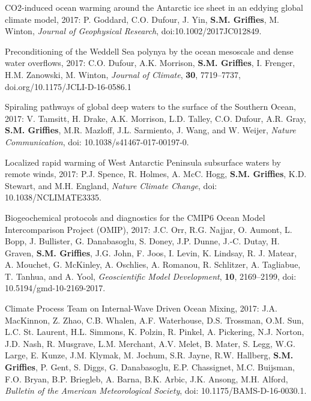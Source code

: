 \begin{etaremune}
\item CO2-induced ocean warming around the Antarctic ice sheet in an eddying global climate model, 2017: P. Goddard, C.O. Dufour, J. Yin, {\bf S.M. Grif\/f\/ies}, M. Winton, {\it Journal of Geophysical Research}, doi:10.1002/2017JC012849. 

\item Preconditioning of the Weddell Sea polynya by the ocean mesoscale and dense water overflows, 2017: C.O. Dufour, A.K. Morrison, {\bf S.M. Grif\/f\/ies}, I. Frenger, H.M. Zanowski, M. Winton, {\it Journal of Climate}, {\bf 30}, 7719--7737, doi.org/10.1175/JCLI-D-16-0586.1

\item Spiraling pathways of global deep waters to the surface of the Southern Ocean, 2017: V. Tamsitt, H.  Drake, A.K. Morrison, L.D. Talley, C.O. Dufour, A.R. Gray, {\bf S.M. Grif\/f\/ies}, M.R. Mazloff, J.L. Sarmiento, J. Wang, and W. Weijer, {\it Nature Communication}, doi: 10.1038/s41467-017-00197-0.

\item Localized rapid warming of West Antarctic Peninsula subsurface waters by remote winds, 2017: P.J. Spence, R. Holmes, A. McC. Hogg,   {\bf S.M. Grif\/f\/ies}, K.D. Stewart, and M.H. England, {\it Nature Climate Change}, doi: 10.1038/NCLIMATE3335.

\item Biogeochemical protocols and diagnostics for the CMIP6 Ocean Model Intercomparison Project (OMIP), 2017: J.C. Orr, R.G. Najjar, O. Aumont, L.  Bopp, J. Bullister, G. Danabasoglu, S. Doney,  J.P. Dunne, J.-C. Dutay, H. Graven, {\bf S.M. Grif\/f\/ies}, J.G. John, F. Joos, I. Levin, K. Lindsay, R. J. Matear, A. Mouchet, G. McKinley, A. Oschlies, A. Romanou, R. Schlitzer, A. Tagliabue, T. Tanhua, and A. Yool, {\it Geoscientific Model Development}, {\bf 10}, 2169--2199, doi: 10.5194/gmd-10-2169-2017.

\item Climate Process Team on Internal-Wave Driven Ocean Mixing, 2017:  J.A. MacKinnon,
Z. Zhao, C.B. Whalen, A.F. Waterhouse, D.S. Trossman, O.M. Sun, L.C. St. Laurent, H.L. Simmons, K. Polzin, R. Pinkel, A. Pickering, 
N.J. Norton, J.D. Nash, R. Musgrave, L.M. Merchant, A.V. Melet, B. Mater, S. Legg, 
W.G. Large, E. Kunze, J.M. Klymak,  M. Jochum, S.R. Jayne, R.W. Hallberg, {\bf S.M. Grif\/f\/ies}, P. Gent, S. Diggs, G. Danabasoglu, E.P. Chassignet, M.C. Buijsman, 
 F.O. Bryan, B.P. Briegleb, A. Barna, B.K. Arbic,  J.K. Ansong, M.H. Alford, {\it Bulletin of the American Meteorological Society}, doi: 10.1175/BAMS-D-16-0030.1.


\end{etaremune}
